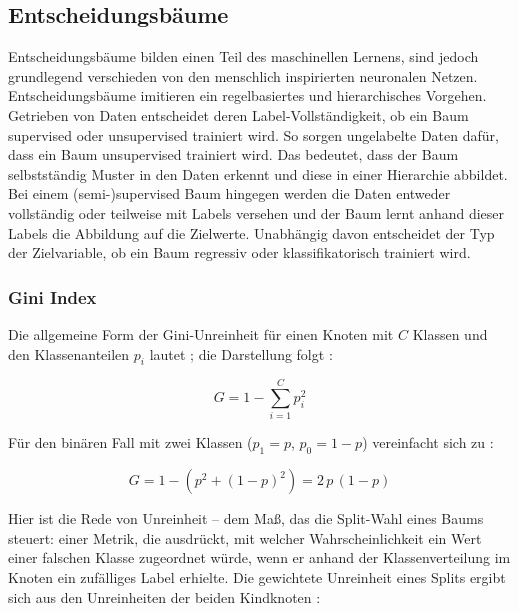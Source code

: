 \subsection{Entscheidungsbäume}
\label{sec:decisiontree}

Entscheidungsbäume bilden einen Teil des maschinellen Lernens, sind jedoch grundlegend verschieden von den menschlich inspirierten neuronalen Netzen. Entscheidungsbäume imitieren ein regelbasiertes und hierarchisches Vorgehen. Getrieben von Daten entscheidet deren Label-Vollständigkeit, ob ein Baum supervised oder unsupervised trainiert wird. So sorgen ungelabelte Daten dafür, dass ein Baum unsupervised trainiert wird. Das bedeutet, dass der Baum selbstständig Muster in den Daten erkennt und diese in einer Hierarchie abbildet. Bei einem (semi-)supervised Baum hingegen werden die Daten entweder vollständig oder teilweise mit Labels versehen und der Baum lernt anhand dieser Labels die Abbildung auf die Zielwerte. Unabhängig davon entscheidet der Typ der Zielvariable, ob ein Baum regressiv oder klassifikatorisch trainiert wird.

\subsubsection{Gini Index}
\label{sec:gini}

Die allgemeine Form der Gini-Unreinheit für einen Knoten mit $C$ Klassen und
den Klassenanteilen $p_i$ lautet \parencite{breiman1984cart}; die Darstellung folgt \parencite[Kap. 9.2.3]{hastie2009elements}:

\begin{equation}
  G = 1 - \sum_{i=1}^{C} p_i^{2}
  \label{eq:gini}
\end{equation}

Für den binären Fall mit zwei Klassen ($p_1 = p$, $p_0 = 1-p$) vereinfacht sich
 zu \parencite{breiman1984cart}:

\begin{equation}
  G = 1 - \left(p^{2} + (1-p)^{2}\right) = 2\,p\,(1-p)
  \label{eq:gini_binaer}
\end{equation}


Hier ist die Rede von Unreinheit -- dem Maß, das die Split-Wahl eines Baums steuert: einer Metrik, die ausdrückt, mit welcher Wahrscheinlichkeit ein Wert einer falschen Klasse zugeordnet würde, wenn er anhand der Klassenverteilung im Knoten ein zufälliges Label erhielte. Die gewichtete Unreinheit eines Splits ergibt sich aus den Unreinheiten der beiden Kindknoten \parencite{breiman1984cart}:

